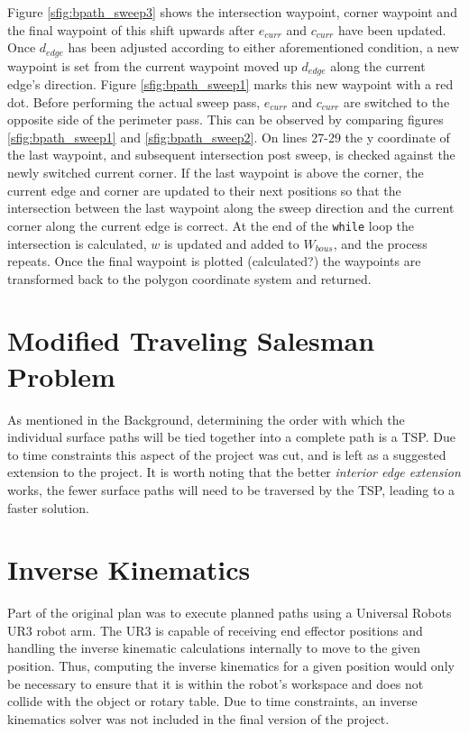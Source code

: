 Figure \ref{sfig:bpath_sweep3} shows the intersection waypoint, corner waypoint and the final waypoint of this shift upwards after $e_{curr}$ and $c_{curr}$ have been updated.
Once $d_{edge}$ has been adjusted according to either aforementioned condition, a new waypoint is set from the current waypoint moved up $d_{edge}$ along the current edge's direction.
Figure \ref{sfig:bpath_sweep1} marks this new waypoint with a red dot.
Before performing the actual sweep pass, $e_{curr}$ and $c_{curr}$ are switched to the opposite side of the perimeter pass.
This can be observed by comparing figures \ref{sfig:bpath_sweep1} and \ref{sfig:bpath_sweep2}.
On lines 27-29 the y coordinate of the last waypoint, and subsequent intersection post sweep, is checked against the newly switched current corner.
If the last waypoint is above the corner, the current edge and corner are updated to their next positions so that the intersection between the last waypoint along the sweep direction and the current corner along the current edge is correct.
At the end of the \verb|while| loop the intersection is calculated, $w$ is updated and added to $W_{bous}$, and the process repeats.
Once the final waypoint is plotted (calculated?) the waypoints are transformed back to the polygon coordinate system and returned.

\iftrue
\section{Modified Traveling Salesman Problem}
As mentioned in the Background, determining the order with which the individual surface paths will be tied together into a complete path is a TSP.
Due to time constraints this aspect of the project was cut, and is left as a suggested extension to the project.
It is worth noting that the better \textit{interior edge extension} works, the fewer surface paths will need to be traversed by the TSP, leading to a faster solution.
\fi

\section{Inverse Kinematics}
Part of the original plan was to execute planned paths using a Universal Robots UR3 robot arm.
The UR3 is capable of receiving end effector positions and handling the inverse kinematic calculations internally to move to the given position.
Thus, computing the inverse kinematics for a given position would only be necessary to ensure that it is within the robot's workspace and does not collide with the object or rotary table.
Due to time constraints, an inverse kinematics solver was not included in the final version of the project.

